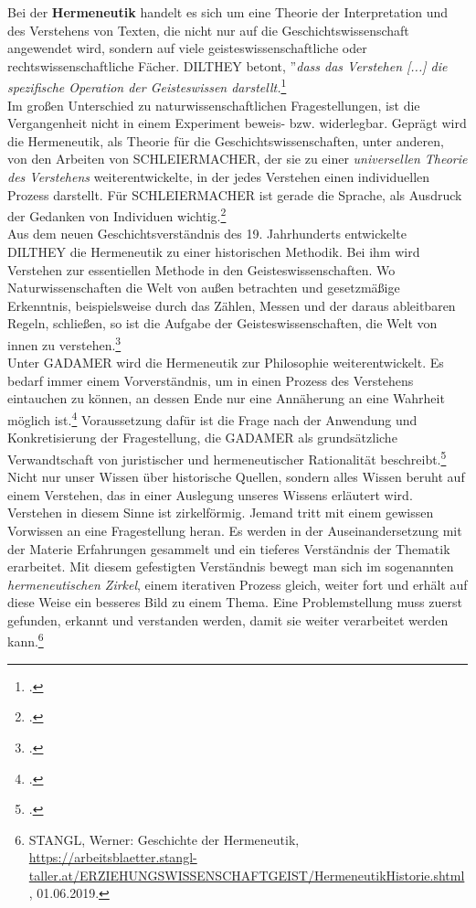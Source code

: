 \documentclass[12pt,a4paper]{article}
\begin{document}
Bei der \textbf{Hermeneutik} handelt es sich um eine Theorie der Interpretation und des Verstehens von Texten, die nicht nur auf die Geschichtswissenschaft angewendet wird, sondern auf viele geisteswissenschaftliche oder rechtswissenschaftliche Fächer.
DILTHEY betont, ''\textit{dass das Verstehen [...] die spezifische Operation der Geisteswissen darstellt.}\footcite[Vgl.][S.82]{ficara2015hermeneutik}
\\
Im großen Unterschied zu naturwissenschaftlichen Fragestellungen, ist die Vergangenheit nicht in einem Experiment beweis- bzw. widerlegbar. Geprägt wird die Hermeneutik, als Theorie für die Geschichtswissenschaften, unter anderen, von den Arbeiten von SCHLEIERMACHER, der sie zu einer \textit{universellen Theorie des Verstehens} weiterentwickelte, in der jedes Verstehen einen individuellen Prozess darstellt. Für SCHLEIERMACHER ist gerade die Sprache, als Ausdruck der Gedanken von Individuen wichtig.\footcite[Vgl.][S.72-81]{ficara2015hermeneutik} 
\\
Aus dem neuen Geschichtsverständnis des 19. Jahrhunderts entwickelte DILTHEY die Hermeneutik zu einer historischen Methodik. Bei ihm wird Verstehen zur essentiellen Methode in den Geisteswissenschaften. Wo Naturwissenschaften die Welt von außen betrachten und gesetzmäßige Erkenntnis, beispielsweise durch das Zählen, Messen und der daraus ableitbaren Regeln, schließen, so ist die Aufgabe der Geisteswissenschaften, die Welt von innen zu verstehen.\footcite[][S.82-83]{ficara2015hermeneutik}
\\
Unter GADAMER wird die Hermeneutik zur Philosophie weiterentwickelt. Es bedarf immer einem Vorverständnis, um in einen Prozess des Verstehens eintauchen zu können, an dessen Ende nur eine Annäherung an eine Wahrheit möglich ist.\footcite[][S.19-30]{schulz2010neuere} Voraussetzung dafür ist die Frage nach der Anwendung und Konkretisierung der Fragestellung, die GADAMER als grundsätzliche Verwandtschaft von juristischer und hermeneutischer Rationalität beschreibt.\footcite[][S.176-178]{ficara2015hermeneutik}
\\
Nicht nur unser Wissen über historische Quellen, sondern alles Wissen beruht auf einem Verstehen, das in einer Auslegung unseres Wissens erläutert wird. Verstehen in diesem Sinne ist zirkelförmig. Jemand tritt mit einem gewissen Vorwissen an eine Fragestellung heran. Es werden in der Auseinandersetzung mit der Materie Erfahrungen gesammelt und ein tieferes Verständnis der Thematik erarbeitet. Mit diesem gefestigten Verständnis bewegt man sich im sogenannten  \textit{hermeneutischen Zirkel}, einem iterativen Prozess gleich, weiter fort und erhält auf diese Weise ein besseres Bild zu einem Thema. Eine Problemstellung muss zuerst gefunden, erkannt und verstanden werden, damit sie weiter verarbeitet werden kann.\footnote{STANGL, Werner: Geschichte der Hermeneutik, \protect\url{https://arbeitsblaetter.stangl-taller.at/ERZIEHUNGSWISSENSCHAFTGEIST/HermeneutikHistorie.shtml}, 01.06.2019.}
\end{document}
